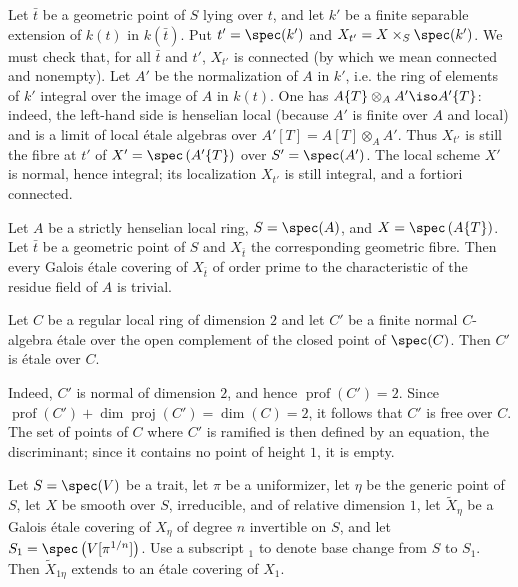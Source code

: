 Let $\bar t$ be a geometric point of $S$ lying over $t$, and let $k'$
be a finite separable extension of $k(t)$ in $k(\bar t)$. Put
$t'=\spec(k')$ and $X_{t'}=X\times_S\spec(k')$. We must check that, for
all $\bar t$ and $t'$, $X_{t'}$ is connected (by which we mean connected
and nonempty). Let $A'$ be the normalization of $A$ in $k'$, i.e. the
ring of elements of $k'$ integral over the image of $A$ in $k(t)$. One
has $A\{T\}\otimes_AA'\iso A'\{T\}$: indeed, the left-hand side is
henselian local (because $A'$ is finite over $A$ and local) and is a
limit of local étale algebras over
$A'[T]=A[T]\otimes_AA'$. Thus $X_{t'}$ is still the fibre at $t'$
of $X'=\spec\left(A'\{T\}\right)$ over $S'=\spec(A')$. The local scheme
$X'$ is normal, hence integral; its localization $X_{t'}$ is still
integral, and a fortiori connected.

\begin{proposition}\label{I:5-2-3}
Let $A$ be a strictly henselian local ring, $S=\spec(A)$, and
$X=\spec\left(A\{T\}\right)$. Let $\bar t$ be a geometric point of $S$
and $X_{\bar t}$ the corresponding geometric fibre. Then every Galois
étale covering of $X_{\bar t}$ of order prime to the characteristic of
the residue field of $A$ is trivial.
\end{proposition}

\begin{lemma} \label{I:5-2-4} %
Let $C$ be a regular local ring of dimension $2$ and let $C'$ be a
finite normal $C$-algebra étale over the open complement of the closed
point of $\spec(C)$. Then $C'$ is étale over $C$.
\end{lemma}

Indeed, $C'$ is normal of dimension $2$, and hence
$\operatorname{prof}(C')=2$. Since
$\operatorname{prof}(C')+\dim\operatorname{proj}(C')=\dim(C)=2$, it
follows that $C'$ is free over $C$. The set of points of $C$ where $C'$
is ramified is then defined by an equation, the discriminant; since it
contains no point of height $1$, it is empty.

\begin{lemma}\label{I:5-2-5} %
Let $S=\spec(V)$ be a trait, let $\pi$ be a uniformizer, let $\eta$ be
the generic point of $S$, let $X$ be smooth over $S$, irreducible, and
of relative dimension $1$, let $\widetilde X_\eta$ be a Galois étale
covering of $X_\eta$ of degree $n$ invertible on $S$, and let
$S_1=\spec\left(V[\pi^{1/n}]\right)$. Use a subscript ${}_1$ to denote
base change from $S$ to $S_1$. Then $\widetilde X_{1\eta}$ extends to an
étale covering of $X_1$.
\end{lemma}

